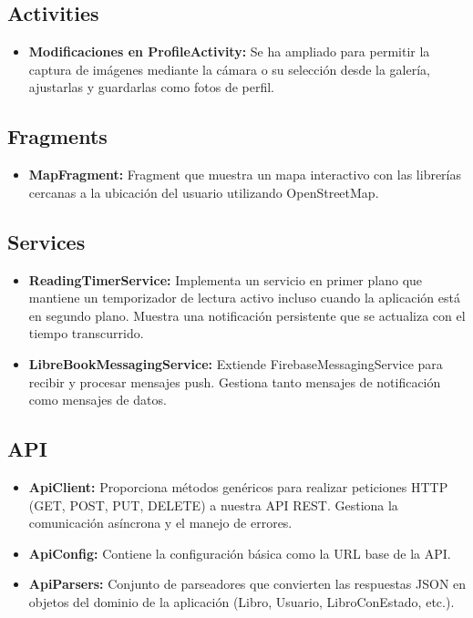 \documentclass[a4paper,11pt]{report}
\begin{document}
      \subsection{Activities}
        \begin{itemize}
          \item \textbf{Modificaciones en ProfileActivity:} Se ha ampliado para permitir la captura de imágenes mediante la cámara o su selección desde la galería, ajustarlas y guardarlas como fotos de perfil.
        \end{itemize}
      \subsection{Fragments}
        \begin{itemize}
          \item \textbf{MapFragment:} Fragment que muestra un mapa interactivo con las librerías cercanas a la ubicación del usuario utilizando OpenStreetMap.
        \end{itemize}
      \subsection{Services}
        \begin{itemize}
          \item \textbf{ReadingTimerService:} Implementa un servicio en primer plano que mantiene un temporizador de lectura activo incluso cuando la aplicación está en segundo plano. Muestra una notificación persistente que se actualiza con el tiempo transcurrido.
          \item \textbf{LibreBookMessagingService:} Extiende FirebaseMessagingService para recibir y procesar mensajes push. Gestiona tanto mensajes de notificación como mensajes de datos.
        \end{itemize}
      \subsection{API}
        \begin{itemize}
          \item \textbf{ApiClient:} Proporciona métodos genéricos para realizar peticiones HTTP (GET, POST, PUT, DELETE) a nuestra API REST. Gestiona la comunicación asíncrona y el manejo de errores.
          \item \textbf{ApiConfig:} Contiene la configuración básica como la URL base de la API.
          \item \textbf{ApiParsers:} Conjunto de parseadores que convierten las respuestas JSON en objetos del dominio de la aplicación (Libro, Usuario, LibroConEstado, etc.).
        \end{itemize}
\end{document}
